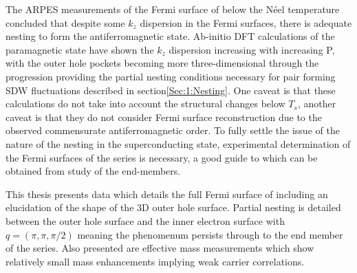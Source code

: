 The ARPES measurements of the Fermi surface of \BaFeAs below the N\'eel temperature concluded that despite some $k_z$ dispersion in the Fermi surfaces, there is adequate nesting to form the antiferromagnetic state. Ab-initio DFT calculations\cite{Shishido2010} of the paramagnetic state have shown the $k_z$ dispersion increasing with increasing P, with the outer hole pockets becoming more three-dimensional through the progression providing the partial nesting conditions necessary for pair forming SDW fluctuations described in section\ref{Sec:1:Nesting}. One caveat is that these calculations do not take into account the structural changes below $T_s$, another caveat is that they do not consider Fermi surface reconstruction due to the observed commensurate antiferromagnetic order. To fully settle the issue of the nature of the nesting in the superconducting state, experimental determination of the Fermi surfaces of the series is necessary, a good guide to which can be obtained from study of the end-members.


This thesis presents data which details the full Fermi surface of \BaFeP including an elucidation of the shape of the 3D outer hole surface. Partial nesting is detailed between the outer hole surface and the inner electron surface with $q=(\pi, \pi, \pi/2)$ meaning the phenomenum persists through to the end member of the series. Also presented are effective mass measurements which show relatively small mass enhancements implying weak carrier correlations.
